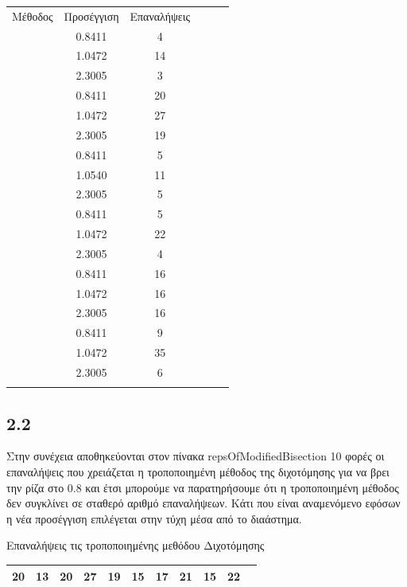 \documentclass[a4paper,11pt]{article}
\begin{document}
\begin{flushleft}
\begin{center}
    \begin{tabular}{|c|c|c|c|c|c|}
        \hline
        Μέθοδος & Προσέγγιση & Επαναλήψεις\\ \Xhline{4\arrayrulewidth}
        \multirow{3}{*}{modifiedNewtonRoots} & 0.8411 & 4 \\ \cline{2-3} & 1.0472 & 14 \\ \cline{2-3} & 2.3005 & 3 \\ \Xhline{4\arrayrulewidth}
        \multirow{3}{*}{modifiedBisectionRoots} & 0.8411 & 20 \\ \cline{2-3} & 1.0472 & 27 \\ \cline{2-3} & 2.3005 & 19 \\ \Xhline{4\arrayrulewidth}
        \multirow{3}{*}{modifiedSecantRoots} & 0.8411 & 5 \\ \cline{2-3} & 1.0540 & 11 \\ \cline{2-3} & 2.3005 & 5 \\ \Xhline{4\arrayrulewidth}
        \multirow{3}{*}{newtonRoots} & 0.8411 & 5 \\ \cline{2-3} & 1.0472 & 22 \\ \cline{2-3} & 2.3005 & 4 \\ \Xhline{4\arrayrulewidth}
        \multirow{3}{*}{bisectionRoots} & 0.8411 & 16 \\ \cline{2-3} & 1.0472 & 16 \\ \cline{2-3} & 2.3005 & 16 \\ \Xhline{4\arrayrulewidth}
        \multirow{3}{*}{secantRoots} & 0.8411 & 9 \\ \cline{2-3} & 1.0472 & 35 \\ \cline{2-3} & 2.3005 & 6 \\ \Xhline{4\arrayrulewidth}
    \end{tabular}
\end{center}

\subsection*{2.2}    
Στην συνέχεια αποθηκεύονται στον πίνακα repsOfModifiedBisection 10 φορές οι επαναλήψεις που χρειάζεται η τροποποιημένη μέθοδος της διχοτόμησης για να βρει την ρίζα στο 0.8 και έτσι μπορούμε να παρατηρήσουμε ότι η τροποποιημένη μέθοδος δεν συγκλίνει σε σταθερό αριθμό επαναλήψεων. Κάτι που είναι αναμενόμενο εφόσων η νέα προσέγγιση επιλέγεται στην τύχη μέσα από το διαάστημα. 
    
\begin{center}
    Επαναλήψεις τις τροποποιημένης μεθόδου Διχοτόμησης
    \begin{tabular}{|c|c|c|c|c|c|c|c|c|c|c|}
        \hline
        20 & 13 & 20 & 27 & 19 & 15 & 17 & 21 & 15 & 22 \\
        \hline
    \end{tabular}
\end{center}


\end{flushleft}
\end{document}
